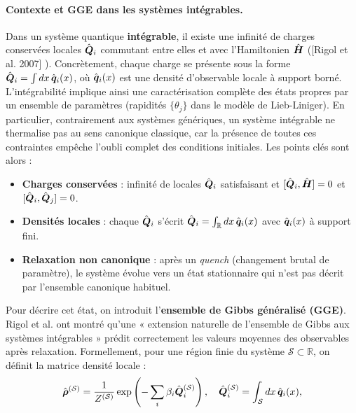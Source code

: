 \paragraph{Contexte et GGE dans les systèmes intégrables.}

Dans un système quantique {\bf intégrable}, il existe une infinité de charges conservées locales $\hat{\bm{Q}}_i$ commutant entre elles et avec l’Hamiltonien $\hat{\bm{H}}$ ([Rigol et al. 2007] ). Concrètement, chaque charge se présente sous la forme $\hat{\bm{Q}}_i = \int dx \,\hat{\bm{q}}_i(x)$, où $\hat{\bm{q}}_i(x)$ est une densité d’observable locale à support borné. L’intégrabilité implique ainsi une caractérisation complète des états propres par un ensemble de paramètres (rapidités $\{\theta_j\}$ dans le modèle de Lieb-Liniger). En particulier, contrairement aux systèmes génériques, un système intégrable ne thermalise pas au sens canonique classique, car la présence de toutes ces contraintes empêche l’oubli complet des conditions initiales. Les points clés sont alors :

\begin{itemize}[label = $\bullet$]
	\item {\bf Charges conservées} : infinité de locales $\hat{\bm{Q}}_i$ satisfaisant et $[\hat{\bm{Q}}_i , \hat{\bm{H}} ] = 0$ et $[\hat{\bm{Q}}_i , \hat{\bm{Q}}_j ] = 0$.
	\item {\bf Densités locales} : chaque $\hat{\bm{Q}}_i$ s’écrit $\hat{\bm{Q}}_i = \int_\mathbb{R} dx \, \hat{\bm{q}}_i(x)$ avec $\hat{\bm{q}}_i(x)$ à support fini.
	\item {\bf Relaxation non canonique} : après un {\em quench} (changement brutal de paramètre), le système évolue vers un état stationnaire qui n’est pas décrit par l’ensemble canonique habituel.
\end{itemize}

Pour décrire cet état, on introduit l’{\bf ensemble de Gibbs généralisé (GGE)}. Rigol et al. ont montré qu’une « extension naturelle de l’ensemble de Gibbs aux systèmes intégrables » prédit correctement les valeurs moyennes des observables après relaxation.  Formellement, pour une région finie du système $\mathcal{S} \subset \mathbb{R}$, on définit la matrice densité locale :
\begin{eqnarray}
	\hat{\bm{\rho}}^{(\mathcal{S})} = \frac{1}{Z^{(\mathcal{S})}}\exp \left ( - \sum_i \beta_i \hat{\bm{Q}}_i^{(\mathcal{S})} \right), \quad \hat{\bm{Q}}_i^{(\mathcal{S})} = \int_\mathcal{S} dx \, \hat{\bm{q}}_i(x), 	
\end{eqnarray}

